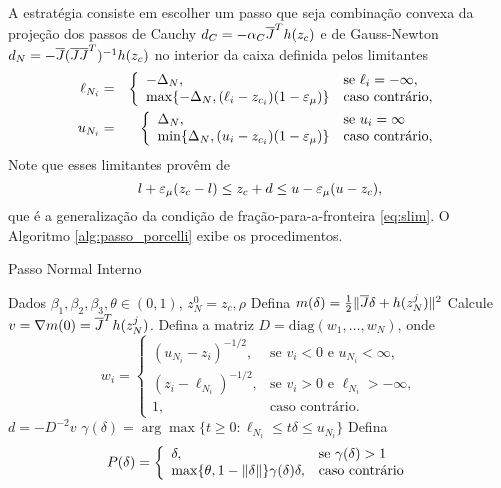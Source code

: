 A estratégia consiste em escolher um passo que seja combinação convexa
da projeção dos passos de Cauchy 
$d_C = -\alpha_C \overline{J}^Th(z_c)$ 
e de Gauss-Newton
$d_N = -\overline{J}(\overline{J}\overline{J}^T)^{-1}h(z_c)$
no interior da caixa definida pelos limitantes 
\begin{eqnarray*}
  \ell_{N_i} & = & \left\{
\begin{array}{ll}
 -\Delta_N, & \mbox{se } \ell_i = -\infty, \\
 \max\{-\Delta_N, (\ell_i - z_{c_i})(1 - \varepsilon_{\mu})\} & \mbox{caso contrário},
\end{array}
\right. \\
u_{N_i} & = & \left\{
\begin{array}{ll}
 \Delta_N, & \mbox{se } u_i = \infty \\
 \min\{\Delta_N, (u_i - z_{c_i})(1 - \varepsilon_{\mu})\} & \mbox{caso contrário},
\end{array}
\right.
\end{eqnarray*}
Note que esses limitantes provêm de
\begin{equation}
  l + \varepsilon_{\mu}(z_c-l) \leq z_c + d \leq u - \varepsilon_{\mu}(u-z_c),
\end{equation}
que é a generalização da condição de fração-para-a-fronteira \eqref{eq:slim}.
O Algoritmo \ref{alg:passo_porcelli} exibe os procedimentos.
\begin{algorithm}[H]
\caption{Passo Normal Interno}\label{alg:passo_porcelli}
\begin{algorithmic}[1]
\State Dados $\beta_1, \beta_2, \beta_3, \theta\in(0,1)$, $z_N^0 = z_c, \rho$
  \State Defina $m(\delta) = \frac{1}{2}\Vert \overline{J}\delta + h(z_N^j)\Vert^2$
  \State Calcule $v = \nabla m(0) = \overline{J}^Th(z_N^j)$.
  \State Defina a matriz $D = \mbox{diag}(w_1,\dots,w_N)$, onde
\begin{equation}
  w_i = \left\{
  \begin{array}{ll}
    (u_{N_i} - z_i)^{-1/2}, & \mbox{se } v_i < 0 \mbox{ e } u_{N_i} <
    \infty, \\
    (z_i - \ell_{N_i})^{-1/2}, & \mbox{se } v_i > 0 \mbox{ e } \ell_{N_i} >
    -\infty, \\
  1, & \mbox{caso contrário}.
  \end{array} \right.
\end{equation}
  \State $d = -D^{-2}v$
  \State $\gamma(\delta) = \arg\max\{t \geq 0: \ell_{N_i}\leq t\delta \leq
    u_{N_i}\}$
  \State Defina
\begin{equation}
   P(\delta) = \left\{
    \begin{array}{ll}
    \delta, & \mbox{se } \gamma(\delta) > 1 \\
    \max\{\theta, 1 - \Vert \delta\Vert\}\gamma(\delta)\delta, & \mbox{caso
      contrário}
  \end{array}\right.
\end{equation}
\end{algorithmic}
\end{algorithm}
